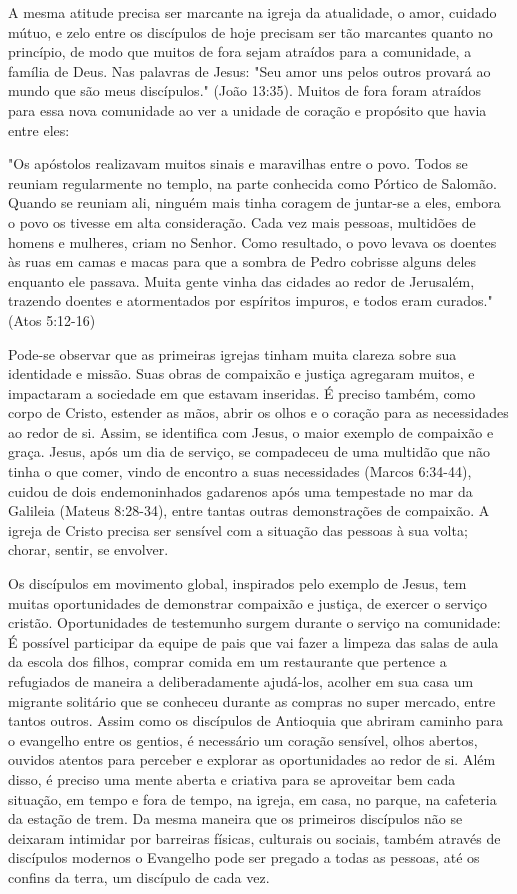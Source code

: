 \documentclass[12pt,openright,oneside,a4paper]{abntex2}
\begin{document}
A mesma atitude precisa ser marcante na igreja da atualidade, o amor, cuidado mútuo, e zelo entre os discípulos de hoje precisam ser tão marcantes quanto no princípio, de modo que muitos de fora sejam atraídos para a comunidade, a família de Deus. Nas palavras de Jesus: "Seu amor uns pelos outros provará ao mundo que são meus discípulos." (João 13:35). Muitos de fora foram atraídos para essa nova comunidade ao ver a unidade de coração e propósito que havia entre eles:

\begin{citacao}"Os apóstolos realizavam muitos sinais e maravilhas entre o povo. Todos se reuniam regularmente no templo, na parte conhecida como Pórtico de Salomão. Quando se reuniam ali, ninguém mais tinha coragem de juntar-se a eles, embora o povo os tivesse em alta consideração. Cada vez mais pessoas, multidões de homens e mulheres, criam no Senhor. Como resultado, o povo levava os doentes às ruas em camas e macas para que a sombra de Pedro cobrisse alguns deles enquanto ele passava. Muita gente vinha das cidades ao redor de Jerusalém, trazendo doentes e atormentados por espíritos impuros, e todos eram curados." (Atos 5:12-16)\end{citacao}

Pode-se observar que as primeiras igrejas tinham muita clareza sobre sua identidade e missão. Suas obras de compaixão e justiça agregaram muitos, e impactaram a sociedade em que estavam inseridas. É preciso também, como corpo de Cristo, estender as mãos, abrir os olhos e o coração para as necessidades ao redor de si. Assim, se identifica com Jesus, o maior exemplo de compaixão e graça. Jesus, após um dia de serviço, se compadeceu de uma multidão que não tinha o que comer, vindo de encontro a suas necessidades (Marcos 6:34-44), cuidou de dois endemoninhados gadarenos após uma tempestade no mar da Galileia (Mateus 8:28-34), entre tantas outras demonstrações de compaixão. A igreja de Cristo precisa ser sensível com a situação das pessoas à sua volta; chorar, sentir, se envolver\cite[p. 172]{brandao}.

Os discípulos em movimento global, inspirados pelo exemplo de Jesus, tem muitas oportunidades de demonstrar compaixão e justiça, de exercer o serviço cristão. Oportunidades de testemunho surgem durante o serviço na comunidade: É possível participar da equipe de pais que vai fazer a limpeza das salas de aula da escola dos filhos, comprar comida em um restaurante que pertence a refugiados de maneira a deliberadamente ajudá-los, acolher em sua casa um migrante solitário que se conheceu durante as compras no super mercado, entre tantos outros. Assim como os discípulos de Antioquia que abriram caminho para o evangelho entre os gentios, é necessário um coração sensível, olhos abertos, ouvidos atentos para perceber e explorar as oportunidades ao redor de si. Além disso, é preciso uma mente aberta e criativa para se aproveitar bem cada situação, em tempo e fora de tempo, na igreja, em casa, no parque, na cafeteria da estação de trem. Da mesma maneira que os primeiros discípulos não se deixaram intimidar por barreiras físicas, culturais ou sociais, também através de discípulos modernos o Evangelho pode ser pregado a todas as pessoas, até os confins da terra, um discípulo de cada vez.
\end{document}
